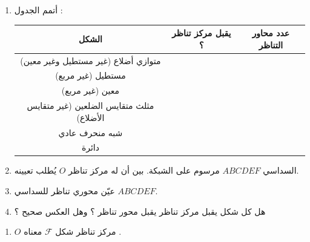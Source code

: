 \documentclass[12pt,a4paper]{article}
\begin{document}
\begin{corr}[title={مراكز التناظر ومحاوره}, stars=3, source={Axiomaths}]
\begin{enumerate}
  \item أتمم الجدول :
  \begin{center}
  \renewcommand{\arraystretch}{1.5}
  \begin{tabular}{|c|c|c|}
    \hline
    الشكل & يقبل مركز تناظر ؟ & عدد محاور التناظر \\ \hline
    متوازي أضلاع (غير مستطيل وغير معين) & \phantom{لا نهاية} & \phantom{لا نهاية} \\ \hline
    مستطيل (غير مربع) & & \\ \hline
    معين (غير مربع) & & \\ \hline
    مثلث متقايس الضلعين (غير متقايس الأضلاع) & & \\ \hline
    شبه منحرف عادي & & \\ \hline
    دائرة & & \\ \hline
  \end{tabular}
  \end{center}
  \item السداسي $ABCDEF$ مرسوم على الشبكة. بين أن له مركز تناظر $O$ يُطلب تعيينه.
  \begin{center}
  \end{center}
  \item عيّن محوري تناظر للسداسي $ABCDEF$.
  \item هل كل شكل يقبل مركز تناظر يقبل محور تناظر ؟ وهل العكس صحيح ؟
\end{enumerate}
\axsol
\begin{enumerate}[itemsep=14pt]
  \item\leavevmode
  \begin{prop}
  $O$ مركز تناظر شكل $\mathcal{F}$ معناه .
  \end{prop}
  \begin{center}
  \renewcommand{\arraystretch}{1.5}

\end{center}
\end{enumerate}
\end{corr}
\end{document}
